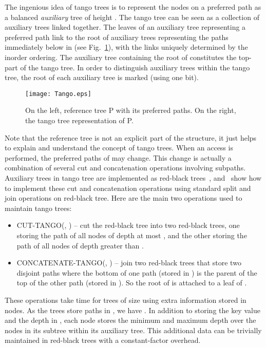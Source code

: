 \documentclass[letterpaper,11pt]{article}
\newcounter{todo}
\newcommand{\todo}[1]{}
\begin{document}
The ingenious idea of tango trees is to represent the nodes on a preferred
path as a balanced \emph{auxiliary} tree of height . The
tango tree can be seen as a collection of auxiliary trees linked
together. The leaves of an auxiliary tree representing a preferred path 
link to the root of auxiliary trees representing the paths immediately
below  in  (see Fig.~\ref{fig-tango}), with the links uniquely
determined by the inorder ordering. The auxiliary tree containing the root
of  constitutes the top-part of the tango tree. In order to distinguish
auxiliary trees within the tango tree, the root of each auxiliary tree is
marked (using one bit).

\begin{figure}\begin{center}
        \texttt{[image: Tango.eps]}
    \end{center}
    \caption{\label{fig-tango} On the left, reference tree P with its
    preferred paths. On the right, the tango tree representation of P.}
\end{figure}

\todo{Why are the same letters used repeatedly for different subtrees in
Fig.~\ref{fig-tango}?  Rolf.}

Note that the reference tree  is not an explicit part of the structure,
it just helps to explain and understand the concept of tango trees. When an
access is performed, the preferred paths of  may change. This change is
actually a combination of several cut and concatenation operations
involving subpaths. Auxiliary trees in tango tree are implemented as
red-black trees~\cite{redblack}, and~\cite{tango} show how to implement
these cut and concatenation operations using standard split and join
operations on red-black tree. Here are the main two operations used to
maintain tango trees:
\begin{itemize}
\item C{\scriptsize UT}-T{\scriptsize ANGO}(, ) -- cut the red-black tree  into two red-black trees, one storing the path of all nodes of depth at most , and the other storing the path of all nodes of depth greater than .
\item C{\scriptsize ONCATENATE}-T{\scriptsize ANGO}(, ) -- join two red-black trees that store two disjoint paths where the bottom of one path (stored in ) is the parent of the top of the other path (stored in ). So the root of  is attached to a leaf of . 
\end{itemize}

These operations take  time for trees of size  using extra
information stored in nodes. As the trees store paths in , we have . In addition to storing the key value and the depth in , each
node stores the minimum and maximum depth over the nodes in its subtree
within its auxiliary tree. This additional data can be trivially maintained
in red-black trees with a constant-factor overhead.
\end{document}
